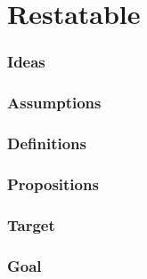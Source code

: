 \chapter{Restatable}
\label{cha:restatable}

\subsection*{Ideas}

\ideaUSE*

\ideaDefeatersForCS*

\ideaEIS*

\ideaDismissingDefeaters*

\ideaCSbyAR*

\ideaCSbyWR*

\subsection*{Assumptions}

\assuCSVP*

\assuCSRR*

\assuNFCS*

\assuEIS*

\assuCSbyPCS*

\assuCSPersists*

\assuDetachToClaim*

\subsection*{Definitions}


\expectationDef*









\subsection*{Propositions}

\propRecogniseDefeaters*

\propInfoToExpectation*

\propExpectNai*

\propScenariosExist*

\propAbilityExuastive*

\propNoESUandADB*

\propNI*

\propInheritance*

\subsection*{Target}

\targetESU*

\targeGESU*

\subsection*{Goal}

\goalEAS*

\ideaEASw*





